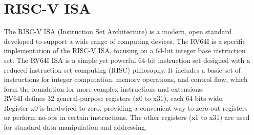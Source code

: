 \newpage
\vspace*{-2cm} %

\section{RISC-V ISA}
The RISC-V ISA (Instruction Set Architecture) is a modern, open standard developed to support a wide range of computing devices. The RV64I is a specific implementation of the RISC-V ISA, focusing on a 64-bit integer base instruction set. The RV64I ISA is a simple yet powerful 64-bit instruction set designed with a reduced instruction set computing (RISC) philosophy. It includes a basic set of instructions for integer computation, memory operations, and control flow, which form the foundation for more complex instructions and extensions.\\
\vspace{\baselineskip}
RV64I defines 32 general-purpose registers (x0 to x31), each 64 bits wide. Register x0 is hardwired to zero, providing a convenient way to zero out registers or perform no-ops in certain instructions. The other registers (x1 to x31) are used for standard data manipulation and addressing.

